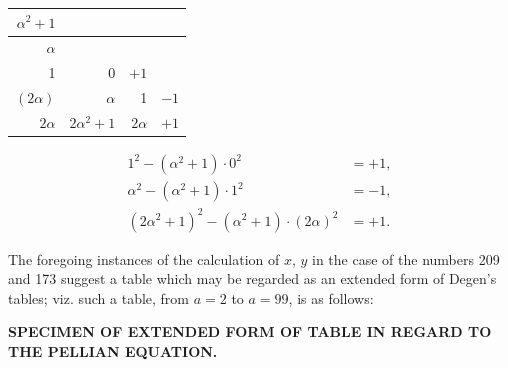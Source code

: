 \documentclass[11pt,a4paper]{book}
\begin{document}
\begin{center}
\begin{tabular}{r|r|r|r}
$\alpha^{2}+1$ & & & \\ \hline
$\alpha$ & & & \\
1 & 0 & $+1$ & \\
$(2\alpha)$ & $\alpha$ & 1 & $-1$ \\
$2\alpha$ & $2\alpha^{2}+1$ & $2\alpha$ & $+1$
\end{tabular}
\end{center}
\[
\begin{aligned}
1^{2} - (\alpha^{2}+1) \cdot 0^{2} &= +1, \\
\alpha^{2} - (\alpha^{2}+1) \cdot 1^{2} &= -1, \\
(2\alpha^{2}+1)^{2} - (\alpha^{2}+1) \cdot (2\alpha)^{2} &= +1.
\end{aligned}
\]

\newpage
The foregoing instances of the calculation of $x$, $y$ in the case of the numbers 209 and 173 suggest a table which may be regarded as an extended form of Degen's tables; viz. such a table, from $a = 2$ to $a = 99$, is as follows:

\begin{center}
\textbf{SPECIMEN OF EXTENDED FORM OF TABLE IN REGARD TO THE PELLIAN EQUATION.}
\end{center}
\end{document}
